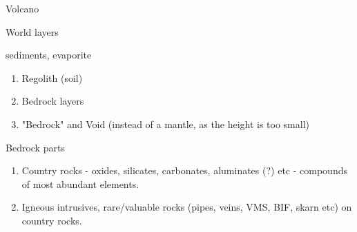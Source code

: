 \documentclass[12pt]{article}
\begin{document}
    Volcano

    World layers

    sediments, evaporite

    \begin{enumerate}
        \item Regolith (soil)
        \item Bedrock layers
        \item "Bedrock" and Void (instead of a mantle, as the height is too small)
    \end{enumerate}

    Bedrock parts

    \begin{enumerate}
        \item Country rocks - oxides, silicates, carbonates, aluminates (?) etc - compounds of most abundant elements.
        \item Igneous intrusives, rare/valuable rocks (pipes, veins, VMS, BIF, skarn etc) on country rocks.
    \end{enumerate}
\end{document}
